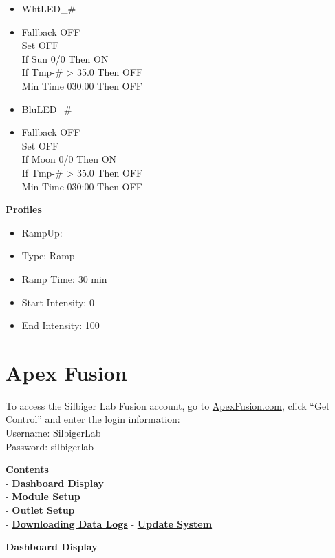\documentclass[]{book}
\providecommand{\tightlist}{%
  \setlength{\itemsep}{0pt}\setlength{\parskip}{0pt}}
\begin{document}
\begin{itemize}
\item
  WhtLED\_\#
\item
  Fallback OFF\\
  Set OFF\\
  If Sun 0/0 Then ON\\
  If Tmp-\# \textgreater{} 35.0 Then OFF\\
  Min Time 030:00 Then OFF
\item
  BluLED\_\#
\item
  Fallback OFF\\
  Set OFF\\
  If Moon 0/0 Then ON\\
  If Tmp-\# \textgreater{} 35.0 Then OFF\\
  Min Time 030:00 Then OFF
\end{itemize}

 \textbf{Profiles}

\begin{itemize}
\tightlist
\item
  RampUp:
\item
  Type: Ramp
\item
  Ramp Time: 30 min
\item
  Start Intensity: 0
\item
  End Intensity: 100
\end{itemize}

\chapter{Apex Fusion}\label{apex-fusion}

To access the Silbiger Lab Fusion account, go to
\href{https://apexfusion.com}{ApexFusion.com}, click ``Get Control'' and
enter the login information:\\
Username: SilbigerLab\\
Password: silbigerlab

\textbf{Contents}\\
- \protect\hyperlink{Dashboard}{\textbf{Dashboard Display}}\\
- \protect\hyperlink{Module_Setup}{\textbf{Module Setup}}\\
- \protect\hyperlink{Outlet_Setup}{\textbf{Outlet Setup}}\\
- \protect\hyperlink{Data_Logs}{\textbf{Downloading Data Logs}} -
\protect\hyperlink{Update}{\textbf{Update System}}

 \textbf{Dashboard Display}
\end{document}
